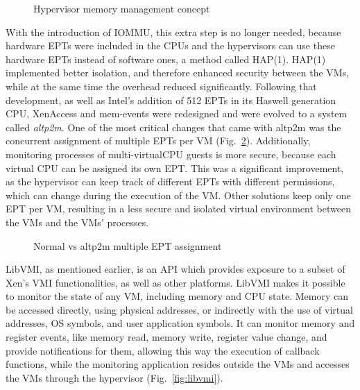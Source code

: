 \begin{figure}
	\centering
	
	\caption{Hypervisor memory management concept}
	\label{fig:hypmm}
\end{figure}

\par With the introduction of \ac{IOMMU}, this extra step is no longer needed, because hardware \acp{EPT} were included in the \ac{CPU}s and the hypervisors can use these hardware \acp{EPT} instead of software ones, a method called \ac{HAP(1)}. \ac{HAP(1)} implemented better isolation, and therefore enhanced security between the \acp{VM}, while at the same time the overhead reduced significantly. Following that development, as well as Intel's addition of 512 \acp{EPT} in its Haswell generation \ac{CPU}, XenAccess and mem-events were redesigned and were evolved to a system called \emph{altp2m}. One of the most critical changes that came with altp2m was the concurrent assignment of multiple \ac{EPT}s per \ac{VM} (Fig.~\ref{fig:ept}). Additionally, monitoring processes of multi-virtual\ac{CPU} guests is more secure, because each virtual \ac{CPU} can be assigned its own \ac{EPT}. This was a significant improvement, as the hypervisor can keep track of different \acp{EPT} with different permissions, which can change during the execution of the \ac{VM}. Other solutions keep only one \ac{EPT} per \ac{VM}, resulting in a less secure and isolated virtual environment between the \acp{VM} and the \acp{VM}' processes.

\begin{figure}[ht]
	\centering
	\scalebox{0.95}{}
	\caption{Normal vs altp2m multiple \ac{EPT} assignment}
	\label{fig:ept}
\end{figure}

\par LibVMI, as mentioned earlier, is an \ac{API} which provides exposure to a subset of Xen’s \ac{VMI} functionalities, as well as other platforms. LibVMI makes it possible to monitor the state of any \ac{VM}, including memory and \ac{CPU} state. Memory can be accessed directly, using physical addresses, or indirectly with the use of virtual addresses, \ac{OS} symbols, and user application symbols. It can monitor memory and register events, like memory read, memory write, register value change, and provide notifications for them, allowing this way the execution of callback functions, while the monitoring application resides outside the \acp{VM} and accesses the \acp{VM} through the hypervisor (Fig.~\ref{fig:libvmi}). 


